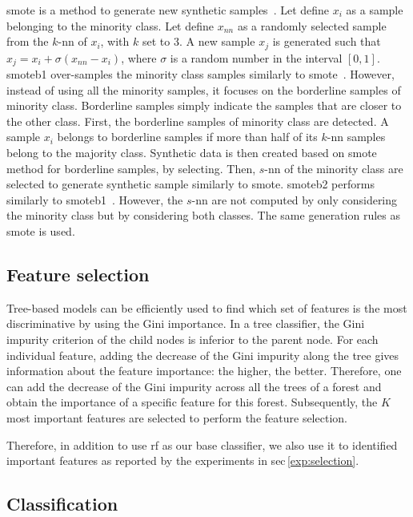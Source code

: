 \documentclass[final,3p,times,twocolumn]{elsarticle}
\begin{document}
\Ac{smote} is a method to generate new synthetic
samples~\cite{chawla2002smote}. Let define $x_i$ as a sample belonging to the
minority class. Let define $x_{nn}$ as a randomly selected sample from the
$k$-\ac{nn} of $x_i$, with $k$ set to 3. A new sample $x_j$ is generated such
that $x_j = x_i + \sigma \left( x_{nn} - x_i \right)$, where $\sigma$ is a
random number in the interval $\left[0,1\right]$. \Ac{smoteb1} over-samples the
minority class samples similarly to \ac{smote}~\cite{han2005borderline}.
However, instead of using all the minority samples, it focuses on the
borderline samples of minority class.  Borderline samples simply indicate the
samples that are closer to the other class. First, the borderline samples of
minority class are detected. A sample $x_{i}$ belongs to borderline samples if
more than half of its $k$-\ac{nn} samples belong to the majority
class. Synthetic data is then created based on \ac{smote} method for borderline
samples, by selecting. Then, $s$-\ac{nn} of the minority class are selected to
generate synthetic sample similarly to \ac{smote}. \Ac{smoteb2} performs
similarly to \ac{smoteb1}~\cite{han2005borderline}.  However, the $s$-\ac{nn}
are not computed by only considering the minority class but by considering both
classes. The same generation rules as \ac{smote} is used.

\subsection{Feature selection}\label{features:selection}

Tree-based models can be efficiently used to find which set of features is the
most discriminative by using the Gini importance. In a tree classifier, the
Gini impurity criterion of the child nodes is inferior to the parent node. For
each individual feature, adding the decrease of the Gini impurity along the
tree gives information about the feature importance: the higher, the
better. Therefore, one can add the decrease of the Gini impurity across all the
trees of a forest and obtain the importance of a specific feature for this
forest. Subsequently, the $K$ most important features are selected to perform
the feature selection.

Therefore, in addition to use \ac{rf} as our base classifier, we also use it to
identified important features as reported by the experiments in
\acs{sec}\,\ref{exp:selection}.

\subsection{Classification}
\end{document}

